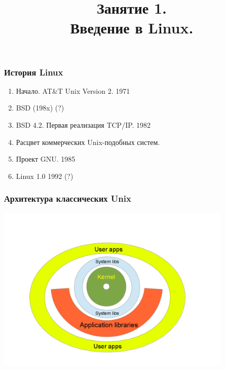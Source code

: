

\title[SaM Solutions. Linux QA Training]
{
  Занятие 1.\\
  Введение в Linux.
}



\begin{frame}
  \titlepage
\end{frame}

\begin{frame}
  \frametitle{История Linux}

  \begin{enumerate}
    \item Начало. AT\&T Unix Version 2. 1971
    \item BSD (198x) (?)
    \item BSD 4.2. Первая реализация TCP/IP. 1982
    \item Расцвет коммерческих Unix-подобных систем.
    \item Проект GNU. 1985 
    \item Linux 1.0 1992 (?)
  \end{enumerate}

\end{frame}

\begin{frame}
  \frametitle{Архитектура классических Unix}
    \includegraphics[height=8cm]{classic-unix-arch}
\end{frame}


